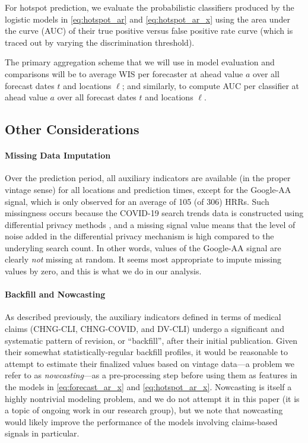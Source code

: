 \documentclass[9pt,twocolumn,twoside,lineno]{pnas-new}
\begin{document}
For hotspot prediction, we evaluate the probabilistic classifiers produced by
the logistic models in \eqref{eq:hotspot_ar} and \eqref{eq:hotspot_ar_x} using
the area under the curve (AUC) of their true positive versus false positive rate 
curve (which is traced out by varying the discrimination threshold). 

The primary aggregation scheme that we will use in model evaluation and
comparisons will be to average WIS per forecaster at ahead value $a$ over all
forecast dates $t$ and locations $\ell$; and similarly, to compute AUC per
classifier at ahead value $a$ over all forecast dates $t$ and locations
$\ell$.

\subsection{Other Considerations}

\paragraph{Missing Data Imputation}

Over the prediction period, all auxiliary indicators are available (in the
proper vintage sense) for all locations and prediction times, except for the
Google-AA signal, which is only observed for an average of 105 (of 306) HRRs.
Such missingness occurs because the COVID-19 search trends data is
constructed using differential privacy methods \cite{Bavadekar:2020}, and a 
missing signal value means that the level of noise added in the differential
privacy mechanism is high compared to the underyling search count.  In other
words, values of the Google-AA signal are clearly \textit{not} missing at
random.  It seems most appropriate to impute missing values by zero, and this is
what we do in our analysis. 

\paragraph{Backfill and Nowcasting}  

As described previously, the auxiliary indicators defined in terms of medical
claims (CHNG-CLI, CHNG-COVID, and DV-CLI) undergo a significant and systematic
pattern of revision, or ``backfill'', after their initial publication.  Given
their somewhat statistically-regular backfill profiles, it would be reasonable
to attempt to estimate their finalized values based on vintage data---a problem
we refer to as \textit{nowcasting}---as a pre-processing step before using them
as features in the models in \eqref{eq:forecast_ar_x} and \eqref{eq:hotspot_ar_x}. 
Nowcasting is itself a highly nontrivial modeling problem, and we do not attempt
it in this paper (it is a topic of ongoing work in our research group), but we
note that nowcasting would likely improve the performance of the models
involving claims-based signals in particular.        
\end{document}
